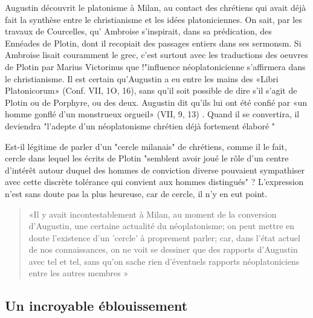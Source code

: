 Augustin découvrit le platonisme à Milan, au contact des chrétiens qui avait déjà
fait la synthèse entre le christianisme et les idées platoniciennes. On sait, par les travaux de Courcelles, qu' Ambroise s'inspirait, dans sa prédication, des Ennéades de
Plotin, dont il recopiait des passages entiers dans ses sermonsm. Si Ambroise lisait couramment le grec, c'est surtout avec les traductions  des  oeuvres  de  Plotin par Marius Victorinus que !"influence néoplatonicienne s'affirmera dans le christianisme. Il est certain qu'Augustin a eu entre les mains des «Libri Platonicorum» (Conf. VII, 1O, 16), sans qu'il soit possible de dire s'il s'agit de Plotin ou de Porphyre, ou des deux. Augustin dit qu'ils lui ont été confié par «un homme gonflé d'un monstrueux orgueil» (VII, 9, 13) . Quand il se convertira, il deviendra "l'adepte d'un néoplatonisme chrétien déjà fortement élaboré "

Est-il légitime de parler d'un	"cercle	milanais" de chrétiens, comme il le fait, cercle dans lequel les écrits de Plotin "semblent avoir joué le rôle d'un centre d'intérêt autour duquel des hommes de conviction diverse pouvaient sympathiser avec cette discrète tolérance qui convient aux hommes distingués" ?	L'expression n'est sans doute pas la plus heureuse, car de cercle, il n'y en eut point.
\begin{quote}
  «Il y avait incontestablement à Milan, au moment de la conversion d'Augustin,	une certaine actualité du néoplatonisme; on peut mettre en doute l'existence d'un 'cercle' à proprement parler; car, dans l'état actuel de nos connaissances, on ne voit se dessiner que des rapports d'Augustin avec tel et tel, sans qu'on sache rien d'éventuels rapports néoplatoniciens entre les autres membres  »  
\end{quote}


\subsection{Un incroyable  éblouissement}

